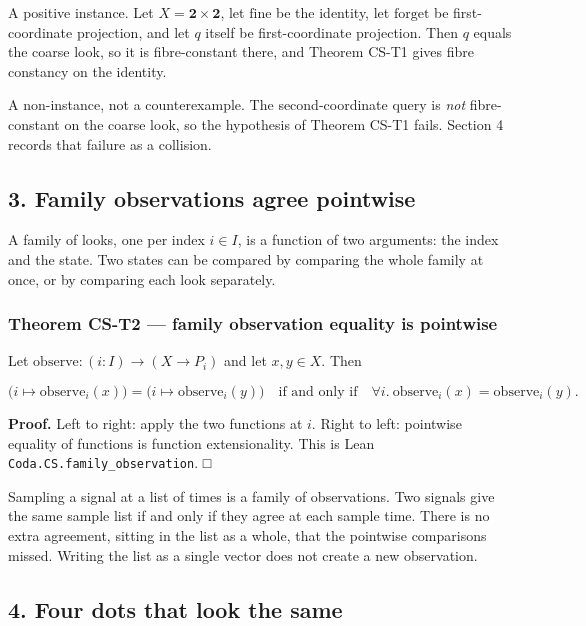\documentclass[
  11pt,
]{article}
\begin{document}
A positive instance. Let \(X=\mathbf{2}\times\mathbf{2}\), let \(\mathrm{fine}\) be the identity, let \(\mathrm{forget}\) be first-coordinate projection, and let \(q\) itself be first-coordinate projection. Then \(q\) equals the coarse look, so it is fibre-constant there, and Theorem CS-T1 gives fibre constancy on the identity.

A non-instance, not a counterexample. The second-coordinate query is \emph{not} fibre-constant on the coarse look, so the hypothesis of Theorem CS-T1 fails. Section 4 records that failure as a collision.

\subsection{3. Family observations agree pointwise}\label{family-observations-agree-pointwise}

A family of looks, one per index \(i\in I\), is a function of two arguments: the index and the state. Two states can be compared by comparing the whole family at once, or by comparing each look separately.

\subsubsection{Theorem CS-T2 --- family observation equality is pointwise}\label{theorem-cs-t2-family-observation-equality-is-pointwise}

Let \(\mathrm{observe}:(i:I)\to (X\to P_i)\) and let \(x,y\in X\). Then

\[
\bigl(i\mapsto \mathrm{observe}_i(x)\bigr)
=
\bigl(i\mapsto \mathrm{observe}_i(y)\bigr)
\quad\text{if and only if}\quad
\forall i.\ \mathrm{observe}_i(x)=\mathrm{observe}_i(y).
\]

\textbf{Proof.} Left to right: apply the two functions at \(i\). Right to left: pointwise equality of functions is function extensionality. This is Lean \nolinkurl{Coda.CS.family_observation}. □

Sampling a signal at a list of times is a family of observations. Two signals give the same sample list if and only if they agree at each sample time. There is no extra agreement, sitting in the list as a whole, that the pointwise comparisons missed. Writing the list as a single vector does not create a new observation.

\subsection{4. Four dots that look the same}\label{four-dots-that-look-the-same}
\end{document}
